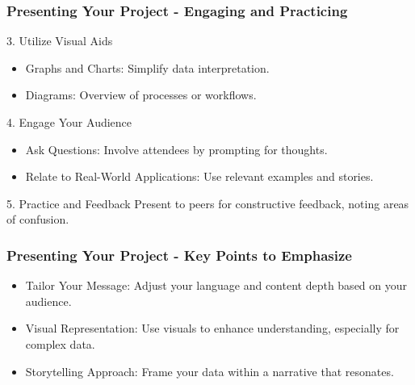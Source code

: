 \documentclass[aspectratio=169]{beamer}
\begin{document}
\begin{frame}[fragile]
    \frametitle{Presenting Your Project - Engaging and Practicing}
    \begin{block}{3. Utilize Visual Aids}
        \begin{itemize}
            \item Graphs and Charts: Simplify data interpretation.
            \item Diagrams: Overview of processes or workflows.
        \end{itemize}
    \end{block}
    
    \begin{block}{4. Engage Your Audience}
        \begin{itemize}
            \item Ask Questions: Involve attendees by prompting for thoughts.
            \item Relate to Real-World Applications: Use relevant examples and stories.
        \end{itemize}
    \end{block}

    \begin{block}{5. Practice and Feedback}
        Present to peers for constructive feedback, noting areas of confusion.
    \end{block}
\end{frame}

\begin{frame}[fragile]
    \frametitle{Presenting Your Project - Key Points to Emphasize}
    \begin{itemize}
        \item Tailor Your Message: Adjust your language and content depth based on your audience.
        \item Visual Representation: Use visuals to enhance understanding, especially for complex data.
        \item Storytelling Approach: Frame your data within a narrative that resonates.
    \end{itemize}
\end{frame}
\end{document}
